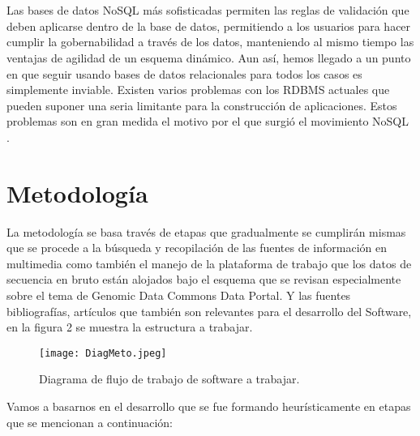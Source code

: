 \documentclass[10pt,a4paper]{article}
\begin{document}
\\
\\
Las bases de datos NoSQL m\'as sofisticadas permiten las reglas de validaci\'on que deben aplicarse dentro de la base de datos, permitiendo a los usuarios para hacer cumplir la gobernabilidad a trav\'es de los datos, manteniendo al mismo tiempo las ventajas de agilidad de un esquema din\'amico.
Aun as\'i, hemos llegado a un punto en que seguir usando bases de datos relacionales para todos los casos es simplemente inviable. Existen varios problemas con los RDBMS actuales que pueden suponer una seria limitante para la construcci\'on de aplicaciones. Estos problemas son en gran medida el motivo por el que surgi\'o el movimiento NoSQL \cite{banker2011}.








\section{Metodología}

La metodolog\'ia se basa trav\'es de etapas que gradualmente se cumplir\'an mismas que se procede a la b\'usqueda y recopilaci\'on de las fuentes de informaci\'on en multimedia como tambi\'en el manejo de la plataforma de trabajo que los datos de secuencia en bruto est\'an alojados bajo el esquema que se revisan especialmente sobre el tema de Genomic Data Commons Data Portal. Y las fuentes bibliograf\'ias, art\'iculos que tambi\'en son relevantes para el desarrollo del Software, en la figura 2 se muestra la estructura a trabajar.


\begin{figure}[hbtp]
\centering
\texttt{[image: DiagMeto.jpeg]}
\caption{Diagrama de flujo de trabajo de software a trabajar.}
\end{figure}


Vamos a basarnos en el desarrollo que se fue formando heur\'isticamente en etapas que se mencionan a continuaci\'on: 
\end{document}
